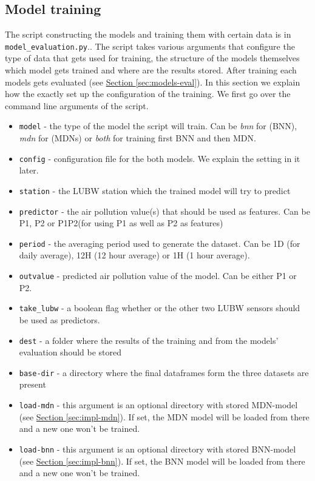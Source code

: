 \documentclass[12pt,a4paper,twoside]{scrartcl}
\numberwithin{equation}{section}
\newcommand{\refsec}[1]{\hyperref[#1]{Section \ref*{#1}}}
\begin{document}
\subsection{Model training}
\label{sec:models-train}
The script constructing the models and training them with certain data is in \texttt{model\_evaluation.py}.. The script takes various arguments that configure the type of data that gets used for training, the structure of the models themselves which model gets trained and where are the results stored. After training each models gets evaluated (see \refsec{sec:models-eval}). In this section we explain how the exactly set up the configuration of the training. We first go over the command line arguments of the script.
\begin{itemize}
\item \texttt{\-\-model} - the type of the model the script will train. Can be \emph{bnn} for (BNN), \emph{mdn} for (MDNs) or \emph{both} for training first BNN and then MDN.
\item \texttt{\-\-config} - configuration file for the both models. We explain the setting in it later.
\item \texttt{\-\-station} - the LUBW station which the trained model will try to predict
\item \texttt{\-\-predictor} - the air pollution value(s) that should be used as features. Can be P1, P2 or P1P2(for using P1 as well as P2 as features)
\item \texttt{\-\-period} - the averaging period used to generate the dataset. Can be 1D (for daily average), 12H (12 hour average) or 1H (1 hour average).
\item \texttt{\-\-outvalue} - predicted air pollution value of the model. Can be either P1 or P2.
\item \texttt{\-\-take_lubw} - a boolean flag whether or the other two LUBW sensors should be used as predictors.
\item \texttt{\-\-dest} - a folder where the results of the training and from the models' evaluation should be stored
\item \texttt{\-\-base-dir} - a directory where the final dataframes form the three datasets are present
\item \texttt{\-\-load-mdn} - this argument is an optional directory with stored MDN-model (see \refsec{sec:impl-mdn}). If set, the MDN model will be loaded from there and a new one won't be trained.
\item \texttt{\-\-load-bnn} - this argument is an optional directory with stored BNN-model (see \refsec{sec:impl-bnn}). If set, the BNN model will be loaded from there and a new one won't be trained.
\end{itemize}
\end{document}
